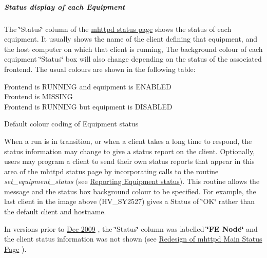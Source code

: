 \par
\hypertarget{RC_mhttpd_status_page_features_RC_mhttpd_eq_status}{}\subparagraph{Status display of each Equipment}\label{RC_mhttpd_status_page_features_RC_mhttpd_eq_status}
The \char`\"{}Status\char`\"{} column of the \hyperlink{RC_mhttpd_status_page_features_RC_mhttpd_status_Equipment_info}{mhttpd status page} shows the status of each equipment. It usually shows the name of the client defining that equipment, and the host computer on which that client is running, The background colour of each equipment \char`\"{}Status\char`\"{} box will also change depending on the status of the associated frontend. The usual colours are shown in the following table:

\begin{center} \begin{table}[h]\begin{TabularC}{1}
\hline
Frontend is RUNNING and equipment is ENABLED  \\
Frontend is MISSING   \\
Frontend is RUNNING but equipment is DISABLED \\
\end{TabularC}
\centering
\caption{Default colour coding of Equipment status }
\end{table}
\par
 \end{center} 

When a run is in transition, or when a client takes a long time to respond, the status information may change to give a status report on the client. Optionally, users may program a client to send their own status reports that appear in this area of the mhttpd status page by incorporating calls to the routine {\itshape set\_\-equipment\_\-status\/} (see \hyperlink{FE_sequence_FE_frontend_status}{Reporting Equipment status}). This routine allows the message and the status box background colour to be specified. For example, the last client in the image above (HV\_\-SY2527) gives a Status of \char`\"{}OK\char`\"{} rather than the default client and hostname.

In versions prior to \hyperlink{NDF_ndf_dec_2009}{Dec 2009} , the \char`\"{}Status\char`\"{} column was labelled {\bfseries \char`\"{}FE Node\char`\"{}} and the client status information was not shown (see \hyperlink{RC_mhttpd_status_page_redesign}{Redesign of mhttpd Main Status Page} ).

\par



